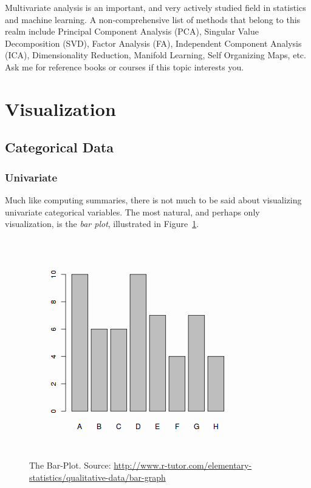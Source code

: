 \documentclass[12pt,a4paper]{report}
\begin{document}
\begin{extra}
Multivariate analysis is an important, and very actively studied field in statistics and machine learning.
A non-comprehensive list of methods that belong to this realm include 
Principal Component Analysis (PCA),
Singular Value Decomposition (SVD), 
Factor Analysis (FA), 
Independent Component Analysis (ICA),
Dimensionality Reduction, 
Manifold Learning, 
Self Organizing Maps, 
etc.
Ask me for reference books or courses if this topic interests you.
\end{extra}



\section{Visualization}

\subsection{Categorical Data}

\subsubsection{Univariate}
Much like computing summaries, there is not much to be said about visualizing univariate categorical variables. 
The most natural, and perhaps only visualization, is the \emph{bar plot}, illustrated in Figure~\ref{fig:barplot}.

\begin{figure}[t]
\centering
\includegraphics[height=0.3\textheight]{art/categorical-data1x}
\caption[Bar Plot]{The Bar-Plot. Source: \url{http://www.r-tutor.com/elementary-statistics/qualitative-data/bar-graph}}
\label{fig:barplot}
\end{figure}
\end{document}
